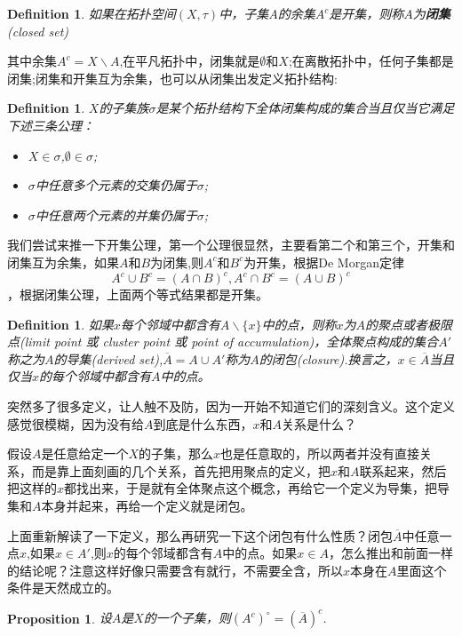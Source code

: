 \documentclass{article}
\newtheorem{proposition}[theorem]{Proposition}
\newtheorem{definition}[theorem]{Definition}
\begin{document}
\begin{definition}
如果在拓扑空间$(X,\tau)$中，子集$A$的余集$A^{c}$是开集，则称$A$为\textbf{闭集}(closed set)
\end{definition}

其中余集$A^{c}= X \smallsetminus A$,在平凡拓扑中，闭集就是$\emptyset$和$X$;在离散拓扑中，任何子集都是闭集;闭集和开集互为余集，也可以从闭集出发定义拓扑结构:

\begin{definition}
$X$的子集族$\sigma$是某个拓扑结构下全体闭集构成的集合当且仅当它满足下述三条公理：
\begin{itemize}
	\item $X \in \sigma$,$\emptyset \in \sigma$;
	\item $\sigma$中任意多个元素的交集仍属于$\sigma$;
	\item $\sigma$中任意两个元素的并集仍属于$\sigma$;
\end{itemize}
\end{definition}

我们尝试来推一下开集公理，第一个公理很显然，主要看第二个和第三个，开集和闭集互为余集，如果$A$和$B$为闭集,则$A^c$和$B^c$为开集，根据De Morgan定律\[A^c \cup B^c = (A \cap B)^c , A^c \cap B^c = (A \cup B)^c\]，根据闭集公理，上面两个等式结果都是开集。

\begin{definition}
如果$x$每个邻域中都含有$A \smallsetminus \{x\}$中的点，则称$x$为$A$的聚点或者极限点(limit point 或 cluster point 或 point of accumulation)，全体聚点构成的集合$A'$称之为$A$的导集(derived set),$\overline{A}=A \cup A'$称为$A$的闭包(closure).换言之，$x \in \overline{A}$当且仅当$x$的每个邻域中都含有$A$中的点。
\end{definition}

突然多了很多定义，让人触不及防，因为一开始不知道它们的深刻含义。这个定义感觉很模糊，因为没有给$A$到底是什么东西，$x$和$A$关系是什么？

假设$A$是任意给定一个$X$的子集，那么$x$也是任意取的，所以两者并没有直接关系，而是靠上面刻画的几个关系，首先把用聚点的定义，把$x$和$A$联系起来，然后把这样的$x$都找出来，于是就有全体聚点这个概念，再给它一个定义为导集，把导集和$A$本身并起来，再给一个定义就是闭包。

上面重新解读了一下定义，那么再研究一下这个闭包有什么性质？闭包$\overline{A}$中任意一点$x$,如果$x \in A'$,则$x$的每个邻域都含有$A$中的点。如果$x \in A$，怎么推出和前面一样的结论呢？注意这样好像只需要含有就行，不需要全含，所以$x$本身在$A$里面这个条件是天然成立的。

\begin{proposition}
设$A$是$X$的一个子集，则$(A^{c})^{\circ}=(\overline{A})^c$.
\end{proposition}
\end{document}
